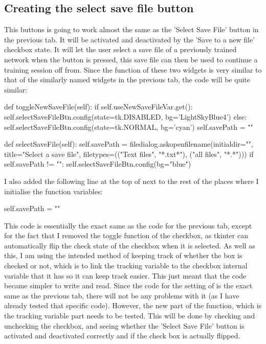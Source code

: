 \documentclass{report}
\begin{document}
\subsection{Creating the select save file button}
This buttons is going to work almost the same as the 'Select Save File' button in the previous tab. It will be activated and deactivated by the 'Save  to a new file' checkbox state. It will let the user select a save file of a previously trained network when the button is pressed, this save file can then be used to continue a training session off from. Since the function of these two widgets is very similar to that of the similarly named widgets in the previous tab, the code will be quite similar:
\begin{python}
def toggleNewSaveFile(self):
    if self.useNewSaveFileVar.get():
        self.selectSaveFileBtn.config(state=tk.DISABLED, bg='LightSkyBlue4')
    else:
        self.selectSaveFileBtn.config(state=tk.NORMAL, bg='cyan')
        self.savePath = ""

def selectSaveFile(self):
    self.savePath = filedialog.askopenfilename(initialdir="",
                                        title="Select a save file",
                                        filetypes=(("Text files", "*.txt*"),
                                        ("all files", "*.*")))
    if self.savePath != "":
        self.selectSaveFileBtn.config(bg="blue")
\end{python}
I also added the following line at the top of  next to the rest of the places where I initialise the function variables:
\begin{python}
self.savePath = ""
\end{python}
This code is essentially the exact same as the code for the previous tab, except for the fact that I removed the toggle function of the checkbox, as tkinter can automatically flip the check state of the checkbox when it is selected. As well as this, I am using the intended method of keeping track of whether the box is checked or not, which is to link the tracking variable to the checkbox internal variable that it has so it can keep track easier. This just meant that the code became simpler to write and read.
\newline
Since the code for the setting of  is the exact same as the previous tab, there will not be any problems with it (as I have already tested that specific code). However, the new part of the function, which is the tracking variable part needs to be tested. This will be done by checking and unchecking the checkbox, and seeing whether the 'Select Save File' button is activated and deactivated correctly and if the check box is actually flipped.
\end{document}
